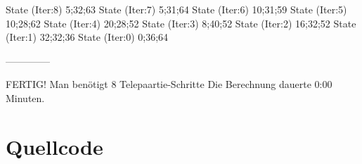\documentclass[a4paper,10pt,ngerman]{scrartcl}
\begin{document}
State (Iter:8) {5;32;63}
State (Iter:7) {5;31;64}
State (Iter:6) {10;31;59}
State (Iter:5) {10;28;62}
State (Iter:4) {20;28;52}
State (Iter:3) {8;40;52}
State (Iter:2) {16;32;52}
State (Iter:1) {32;32;36}
State (Iter:0) {0;36;64}

--------------


FERTIG!
Man benötigt 8 Telepaartie-Schritte
Die Berechnung dauerte 0:00 Minuten.


\section{Quellcode}

\end{document}
